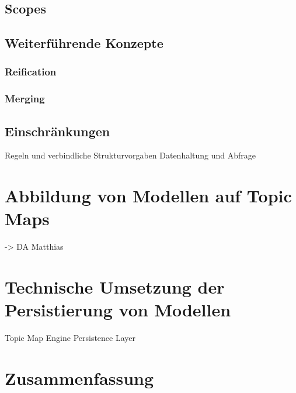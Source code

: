 
\subsection{Scopes} %
\label{sub:scopes}


\subsection{Weiterführende Konzepte} %
\label{sub:tm_weiterführend}

\subsubsection{Reification} %
\label{ssub:reification}


\subsubsection{Merging} %
\label{ssub:merging}


\subsection{Einschränkungen} %
\label{sub:einschränkungen}

Regeln und verbindliche Strukturvorgaben
Datenhaltung und Abfrage

\section{Abbildung von Modellen auf Topic Maps} %
\label{sec:abbildung_von_modellen_auf_topic_maps}
-> DA Matthias

\section{Technische Umsetzung der Persistierung von Modellen} %
\label{sec:technische_umsetzung_der_persistierung_von_modellen}
Topic Map Engine Persistence Layer

\section{Zusammenfassung} %
\label{sec:persistierung_zusammenfassung}

